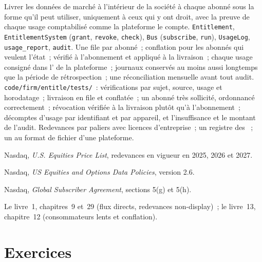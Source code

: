 \begin{build}
 Livrer les données de marché à l'intérieur de la société à chaque abonné sous la forme qu'il peut utiliser, uniquement à ceux qui y ont droit, avec la preuve de
chaque usage comptabilisé comme la plateforme le compte.
 \texttt{Entitlement}, \texttt{EntitlementSystem} (\texttt{grant}, \texttt{revoke}, \texttt{check}), \texttt{Bus}
(\texttt{subscribe}, \texttt{run}), \texttt{UsageLog}, \texttt{usage\_report}, \texttt{audit}.
 Une file par abonné~; conflation pour les abonnés qui veulent l'état~;  vérifié à l'abonnement et appliqué à la
livraison~; chaque usage consigné dans l' de la plateforme~; journaux conservés au moins aussi longtemps que la période de rétrospection~; une réconciliation mensuelle avant tout
audit.
 \texttt{code/firm/entitle/tests/}~: vérifications par sujet, source, usage et horodatage~; livraison en file et conflatée~; un abonné très
sollicité, ordonnancé correctement~; révocation vérifiée à la livraison plutôt qu'à l'abonnement~; décomptes d'usage par identifiant et par appareil, et
l'insuffisance et le montant de l'audit.
 Redevances par paliers avec licences d'entreprise~; un registre des ~; un  au format de fichier d'une plateforme.
\end{build}

\begin{omsources}
\item Nasdaq, \emph{U.S. Equities Price List}, redevances en vigueur en 2025, 2026 et 2027.
\item Nasdaq, \emph{US Equities and Options Data Policies}, version 2.6.
\item Nasdaq, \emph{Global Subscriber Agreement}, sections 5(g) et 5(h).
\item Le livre~1, chapitres~9 et~29 (flux directs, redevances non-display)~; le livre~13, chapitre~12 (consommateurs lents et conflation).
\end{omsources}

\section{Exercices}

